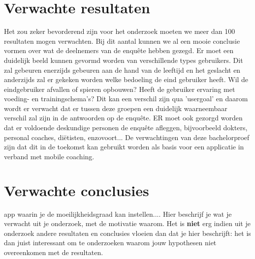\section{Verwachte resultaten}
\label{sec:verwachte_resultaten}
Het zou zeker bevorderend zijn voor het onderzoek moeten we meer dan 100 resultaten mogen verwachten. Bij dit aantal kunnen we al een mooie conclusie vormen over wat de deelnemers van de enquête hebben gezegd. \hfill \break \break
Er moet een duidelijk beeld kunnen gevormd worden van verschillende types gebruikers. Dit zal gebeuren enerzijds gebeuren aan de hand van de leeftijd en het geslacht en anderzijds zal er gekeken worden welke bedoeling de eind gebruiker heeft. Wil de eindgebruiker afvallen of spieren opbouwen? Heeft de gebruiker ervaring met voeding- en trainingschema's? Dit kan een verschil zijn qua 'usergoal' en daarom wordt er verwacht dat er tussen deze groepen een duidelijk waarneembaar verschil zal zijn in de antwoorden op de enquête. ER moet ook gezorgd worden dat er voldoende deskundige personen de enquête afleggen, bijvoorbeeld dokters, personal coaches, diëtisten, enzovoort...\hfill \break \break
De verwachtingen van deze bachelorproef zijn dat dit in de toekomst kan gebruikt worden als basis voor een applicatie in verband met mobile coaching. 

\section{Verwachte conclusies}
\label{sec:verwachte_conclusies}
app waarin je de moeilijkheidsgraad kan instellen....
Hier beschrijf je wat je verwacht uit je onderzoek, met de motivatie waarom. Het is \textbf{niet} erg indien uit je onderzoek andere resultaten en conclusies vloeien dan dat je hier beschrijft: het is dan juist interessant om te onderzoeken waarom jouw hypothesen niet overeenkomen met de resultaten.
